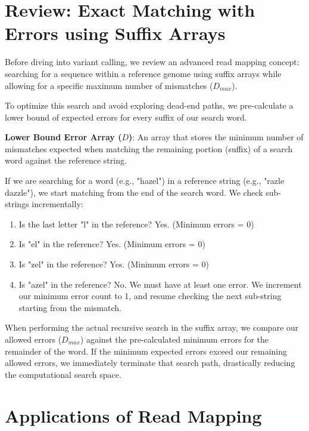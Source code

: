 
\section{Review: Exact Matching with Errors using Suffix Arrays}

Before diving into variant calling, we review an advanced read mapping concept: searching for a sequence within a reference genome using suffix arrays while allowing for a specific maximum number of mismatches (\( D_{max} \)). 

To optimize this search and avoid exploring dead-end paths, we pre-calculate a lower bound of expected errors for every suffix of our search word. 

\begin{important}
  \textbf{Lower Bound Error Array (\(D\))}: An array that stores the minimum number of mismatches expected when matching the remaining portion (suffix) of a search word against the reference string. 
\end{important}

If we are searching for a word (e.g., "hazel") in a reference string (e.g., "razle dazzle"), we start matching from the end of the search word. We check sub-strings incrementally: 
\begin{enumerate}
    \item Is the last letter "l" in the reference? Yes. (Minimum errors = 0)
    \item Is "el" in the reference? Yes. (Minimum errors = 0)
    \item Is "zel" in the reference? Yes. (Minimum errors = 0)
    \item Is "azel" in the reference? No. We must have at least one error. We increment our minimum error count to 1, and resume checking the next sub-string starting from the mismatch.
\end{enumerate}

When performing the actual recursive search in the suffix array, we compare our allowed errors (\( D_{max} \)) against the pre-calculated minimum errors for the remainder of the word. \sta If the minimum expected errors exceed our remaining allowed errors, we immediately terminate that search path, drastically reducing the computational search space.

\section{Applications of Read Mapping}

